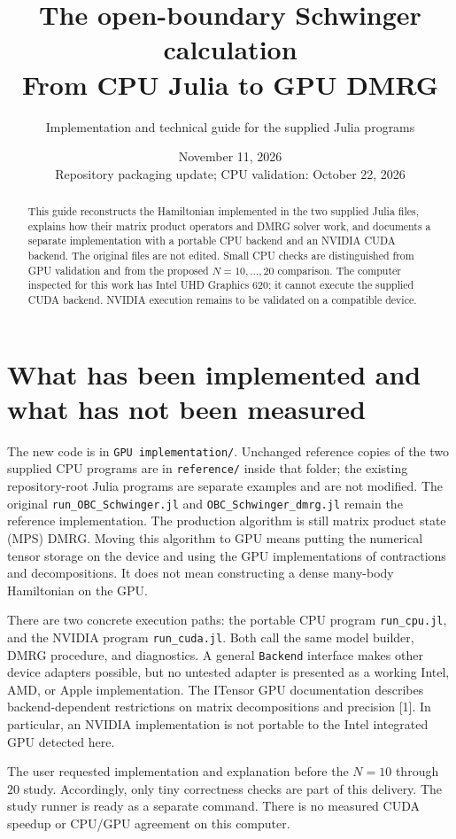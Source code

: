 \documentclass[11pt]{article}
\title{The open-boundary Schwinger calculation\\From CPU Julia to GPU DMRG}
\author{Implementation and technical guide for the supplied Julia programs}
\date{November 11, 2026\\Repository packaging update; CPU validation: October 22, 2026}
\newcommand{\code}[1]{\nolinkurl{#1}}
\begin{document}
\maketitle
\begin{abstract}
This guide reconstructs the Hamiltonian implemented in the two supplied Julia files, explains how their matrix product operators and DMRG solver work, and documents a separate implementation with a portable CPU backend and an NVIDIA CUDA backend. The original files are not edited. Small CPU checks are distinguished from GPU validation and from the proposed $N=10,\ldots,20$ comparison. The computer inspected for this work has Intel UHD Graphics 620; it cannot execute the supplied CUDA backend. NVIDIA execution remains to be validated on a compatible device.
\end{abstract}
\tableofcontents
\newpage

\section{What has been implemented and what has not been measured}
The new code is in \code{GPU implementation/}. Unchanged reference copies of the two supplied CPU programs are in \code{reference/} inside that folder; the existing repository-root Julia programs are separate examples and are not modified. The original \code{run_OBC_Schwinger.jl} and \code{OBC_Schwinger_dmrg.jl} remain the reference implementation. The production algorithm is still matrix product state (MPS) DMRG. Moving this algorithm to GPU means putting the numerical tensor storage on the device and using the GPU implementations of contractions and decompositions. It does not mean constructing a dense many-body Hamiltonian on the GPU.

There are two concrete execution paths: the portable CPU program \code{run_cpu.jl}, and the NVIDIA program \code{run_cuda.jl}. Both call the same model builder, DMRG procedure, and diagnostics. A general \code{Backend} interface makes other device adapters possible, but no untested adapter is presented as a working Intel, AMD, or Apple implementation. The ITensor GPU documentation describes backend-dependent restrictions on matrix decompositions and precision [1]. In particular, an NVIDIA implementation is not portable to the Intel integrated GPU detected here.

The user requested implementation and explanation before the $N=10$ through $20$ study. Accordingly, only tiny correctness checks are part of this delivery. The study runner is ready as a separate command. There is no measured CUDA speedup or CPU/GPU agreement on this computer.
\end{document}
